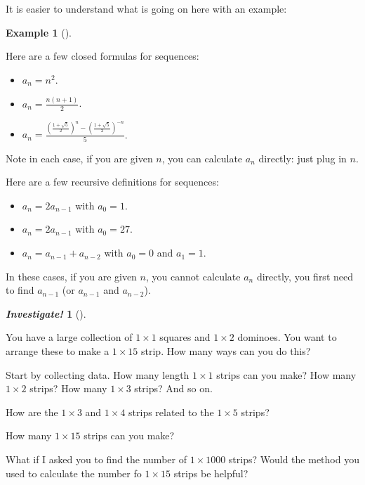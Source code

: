 \documentclass[10pt,]{book}
\theoremstyle{plain}
\theoremstyle{definition}
\newtheorem{example}[theorem]{Example}
\theoremstyle{definition}
\newtheorem{investigation}[project]{\emph{Investigate!}}
\theoremstyle{definition}
\numberwithin{equation}{chapter}
\begin{document}
    It is easier to understand what is going on here with an example:
\begin{example}[]\label{example-58}

        Here are a few closed formulas for sequences:
      \leavevmode%
\begin{itemize}[label=\textbullet]
\item{}\(a_n = n^2\).%
\item{}\(a_n = \frac{n(n+1)}{2}\).%
\item{}\(a_n = \frac{\left(\frac{1 + \sqrt 5}{2}\right)^n - \left(\frac{1 + \sqrt 5}{2}\right)^{-n}}{5}\).%
\end{itemize}

\par

        Note in each case, if you are given \(n\), you can calculate \(a_n\) directly: just plug in \(n\).
\par

        Here are a few recursive definitions for sequences:
      \leavevmode%
\begin{itemize}[label=\textbullet]
\item{}\(a_n = 2a_{n-1}\) with \(a_0 = 1\).%
\item{}\(a_n = 2a_{n-1}\) with \(a_0 = 27\).%
\item{}\(a_n = a_{n-1} + a_{n-2}\) with \(a_0 = 0\) and \(a_1 = 1\).%
\end{itemize}

\par

        In these cases, if you are given \(n\), you cannot calculate \(a_n\) directly, you first need to find \(a_{n-1}\) (or \(a_{n-1}\) and \(a_{n-2}\)). 
\end{example}
\begin{investigation}[]\label{investigation-17}

      You have a large collection of \(1\times 1\) squares and \(1\times 2\) dominoes. You want to arrange these to make a \(1 \times 15\) strip. How many ways can you do this?
\par

            Start by collecting data. How many length \(1\times 1\) strips can you make? How many \(1\times 2\) strips? How many \(1\times 3\) strips? And so on.
\par

            How are the \(1\times 3\) and \(1 \times 4\) strips related to the \(1\times 5\) strips?
\par

            How many \(1\times 15\) strips can you make?
\par

            What if I asked you to find the number of \(1\times 1000\) strips? Would the method you used to calculate the number fo \(1 \times 15\) strips be helpful?
\end{investigation}
\par
\end{document}
